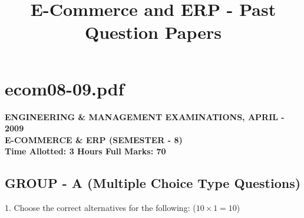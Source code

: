 \documentclass{article}
\title{E-Commerce and ERP - Past Question Papers}
\author{}
\date{}
\begin{document}
\maketitle

\section*{ecom08-09.pdf}
\textbf{ENGINEERING \& MANAGEMENT EXAMINATIONS, APRIL - 2009} \\
\textbf{E-COMMERCE \& ERP (SEMESTER - 8)} \\
\textbf{Time Allotted: 3 Hours \hfill Full Marks: 70}

\subsection*{GROUP - A (Multiple Choice Type Questions)}
1. Choose the correct alternatives for the following: ($10 \times 1 = 10$)
\end{document}
